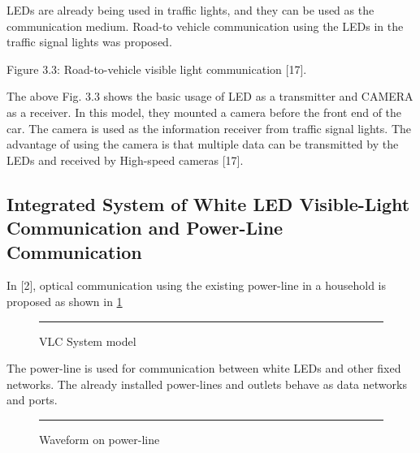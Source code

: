 LEDs are already being used in traffic lights, and they can be used as the communication
medium. Road-to vehicle communication using the LEDs in the traffic signal lights was
proposed.

Figure 3.3: Road-to-vehicle visible light communication [17].

The above Fig. 3.3 shows the basic usage of LED as a transmitter and CAMERA as a
receiver. In this model, they mounted a camera before the front end of the car. The
camera is used as the information receiver from traffic signal lights. The advantage of
using the camera is that multiple data can be transmitted by the LEDs and received by
High-speed cameras [17]. 


\subsection{Integrated System of White LED Visible-Light Communication and Power-Line Communication}

In [2], optical communication using the existing power-line in a household is proposed as
shown in \ref{fig:vlc-model}

\begin{figure}[htbp]
  \centering
    \rule{35em}{0.5pt}
  \caption[VLC System model]{VLC System model}
  \label{fig:vlc-model}
\end{figure}

The power-line is used for communication between white LEDs and other fixed
networks. The already installed power-lines and outlets behave as data networks and
ports.

\begin{figure}[htbp]
  \centering
    \rule{35em}{0.5pt}
  \caption[Waveform on power-linel]{Waveform on power-line}
  \label{fig:vlc-powerline}
\end{figure}


